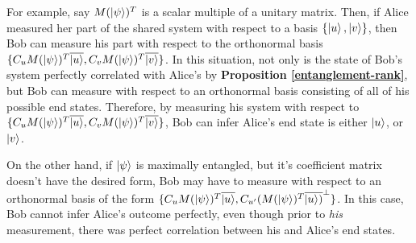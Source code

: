 For example, say $M(\ket{\psi})^T$ is a scalar multiple of a unitary matrix.  Then, if Alice measured her part of the shared system with respect to a basis $\{\ket{u}, \ket{v}\}$, then 
Bob can measure his part with respect to the orthonormal basis $\{C_u M(\ket{\psi})^T\overline{\ket{u}}, C_v M(\ket{\psi})^T\overline{\ket{v}}\}$. In this situation, not only is the state of Bob's system perfectly correlated with Alice's by \textbf{Proposition \ref{entanglement-rank}}, but Bob can measure with respect to an orthonormal basis consisting of all of his possible end states.  Therefore, by measuring his system with respect to $\{C_u M(\ket{\psi})^T\overline{\ket{u}}, C_v M(\ket{\psi})^T\overline{\ket{v}}\}$, Bob can infer Alice's end state is either $\ket{u}$, or $\ket{v}$.

On the other hand, if $\ket{\psi}$ is maximally entangled, but it's coefficient matrix doesn't have the desired form, Bob may have to measure with respect to an orthonormal basis of the form $\{C_u M(\ket{\psi})^T\overline{\ket{u}}, C_{u'}(M(\ket{\psi})^T\overline{\ket{u})}^\perp \}$.  In this case, Bob cannot infer Alice's outcome perfectly, even though prior to {\emph{his}} measurement, there was perfect correlation between his and Alice's end states.  


